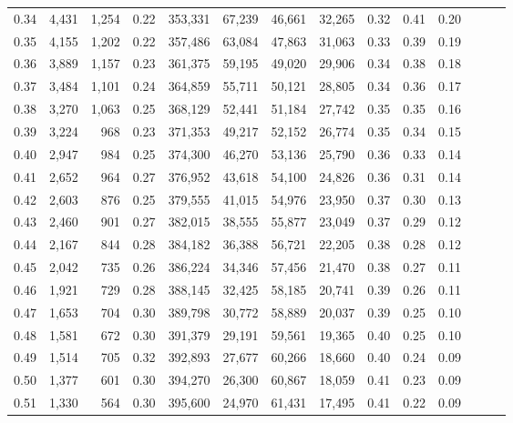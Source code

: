 \begin{tabular}{rrrrrrrrrrrrrr}
0.34 &   4,431 &  1,254 &  0.22 &  353,331 &   67,239 &  46,661 &  32,265 &  0.32 &  0.41 &      0.20 \\
0.35 &   4,155 &  1,202 &  0.22 &  357,486 &   63,084 &  47,863 &  31,063 &  0.33 &  0.39 &      0.19 \\
0.36 &   3,889 &  1,157 &  0.23 &  361,375 &   59,195 &  49,020 &  29,906 &  0.34 &  0.38 &      0.18 \\
0.37 &   3,484 &  1,101 &  0.24 &  364,859 &   55,711 &  50,121 &  28,805 &  0.34 &  0.36 &      0.17 \\
0.38 &   3,270 &  1,063 &  0.25 &  368,129 &   52,441 &  51,184 &  27,742 &  0.35 &  0.35 &      0.16 \\
0.39 &   3,224 &    968 &  0.23 &  371,353 &   49,217 &  52,152 &  26,774 &  0.35 &  0.34 &      0.15 \\
0.40 &   2,947 &    984 &  0.25 &  374,300 &   46,270 &  53,136 &  25,790 &  0.36 &  0.33 &      0.14 \\
0.41 &   2,652 &    964 &  0.27 &  376,952 &   43,618 &  54,100 &  24,826 &  0.36 &  0.31 &      0.14 \\
0.42 &   2,603 &    876 &  0.25 &  379,555 &   41,015 &  54,976 &  23,950 &  0.37 &  0.30 &      0.13 \\
0.43 &   2,460 &    901 &  0.27 &  382,015 &   38,555 &  55,877 &  23,049 &  0.37 &  0.29 &      0.12 \\
0.44 &   2,167 &    844 &  0.28 &  384,182 &   36,388 &  56,721 &  22,205 &  0.38 &  0.28 &      0.12 \\
0.45 &   2,042 &    735 &  0.26 &  386,224 &   34,346 &  57,456 &  21,470 &  0.38 &  0.27 &      0.11 \\
0.46 &   1,921 &    729 &  0.28 &  388,145 &   32,425 &  58,185 &  20,741 &  0.39 &  0.26 &      0.11 \\
0.47 &   1,653 &    704 &  0.30 &  389,798 &   30,772 &  58,889 &  20,037 &  0.39 &  0.25 &      0.10 \\
0.48 &   1,581 &    672 &  0.30 &  391,379 &   29,191 &  59,561 &  19,365 &  0.40 &  0.25 &      0.10 \\
0.49 &   1,514 &    705 &  0.32 &  392,893 &   27,677 &  60,266 &  18,660 &  0.40 &  0.24 &      0.09 \\
0.50 &   1,377 &    601 &  0.30 &  394,270 &   26,300 &  60,867 &  18,059 &  0.41 &  0.23 &      0.09 \\
0.51 &   1,330 &    564 &  0.30 &  395,600 &   24,970 &  61,431 &  17,495 &  0.41 &  0.22 &      0.09 \\

\end{tabular}
